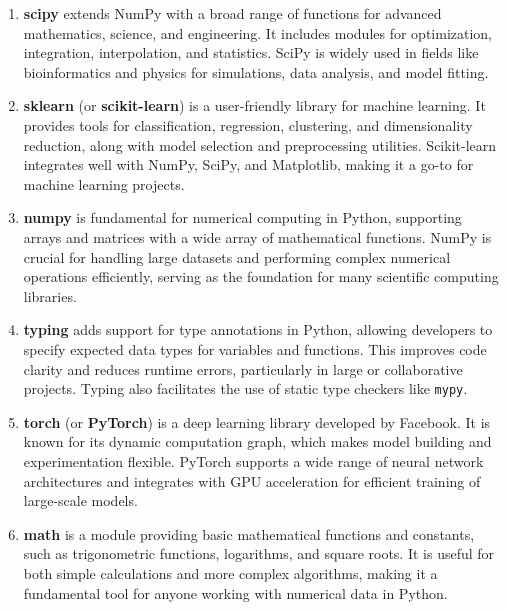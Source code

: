 \begin{enumerate}
    \item \textbf{scipy} extends NumPy with a broad range of functions for advanced mathematics, science, and engineering. It includes modules for optimization, integration, interpolation, and statistics. SciPy is widely used in fields like bioinformatics and physics for simulations, data analysis, and model fitting.
    
    \item \textbf{sklearn} (or \textbf{scikit-learn}) is a user-friendly library for machine learning. It provides tools for classification, regression, clustering, and dimensionality reduction, along with model selection and preprocessing utilities. Scikit-learn integrates well with NumPy, SciPy, and Matplotlib, making it a go-to for machine learning projects.
    
    \item \textbf{numpy} is fundamental for numerical computing in Python, supporting arrays and matrices with a wide array of mathematical functions. NumPy is crucial for handling large datasets and performing complex numerical operations efficiently, serving as the foundation for many scientific computing libraries.
    
    \item \textbf{typing} adds support for type annotations in Python, allowing developers to specify expected data types for variables and functions. This improves code clarity and reduces runtime errors, particularly in large or collaborative projects. Typing also facilitates the use of static type checkers like \texttt{mypy}.
    
    \item \textbf{torch} (or \textbf{PyTorch}) is a deep learning library developed by Facebook. It is known for its dynamic computation graph, which makes model building and experimentation flexible. PyTorch supports a wide range of neural network architectures and integrates with GPU acceleration for efficient training of large-scale models.
    
    \item \textbf{math} is a module providing basic mathematical functions and constants, such as trigonometric functions, logarithms, and square roots. It is useful for both simple calculations and more complex algorithms, making it a fundamental tool for anyone working with numerical data in Python.
    

\end{enumerate}
